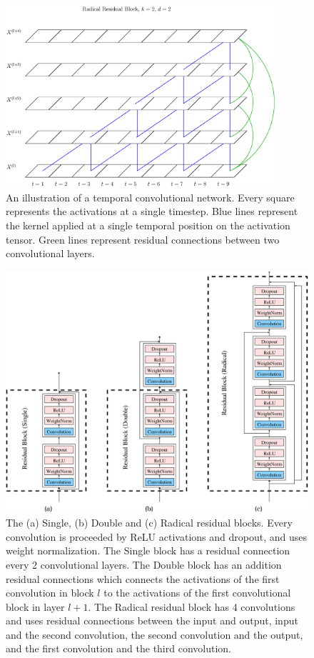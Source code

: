 \documentclass[a4paper, twoside]{article}
\begin{document}
\begin{figure}[h]
\begin{center}
    \includegraphics[width=10cm]{figRadical.eps}\caption{An illustration of a temporal convolutional network. Every square represents the activations at a single timestep. Blue lines represent the kernel applied at a single temporal position on the activation tensor. Green lines represent residual connections between two convolutional layers.}\label{figTCNRadical}
\end{center}
\end{figure}

\begin{figure}[h]
\begin{center}
    \includegraphics[width=16cm]{figGraph.eps}\caption{The (a) Single, (b) Double and (c) Radical residual blocks. Every convolution is proceeded by ReLU activations and dropout, and uses weight normalization. The Single block has a residual connection every 2 convolutional layers. The Double block has an addition residual connections which connects the activations of the first convolution in block $l$ to the activations of the first convolutional block in layer $l+1$. The Radical residual block has 4 convolutions and uses residual connections between the input and output, input and the second convolution, the second convolution and the output, and the first convolution and the third convolution.}\label{figTCNGraph}
\end{center}
\end{figure}
\end{document}
